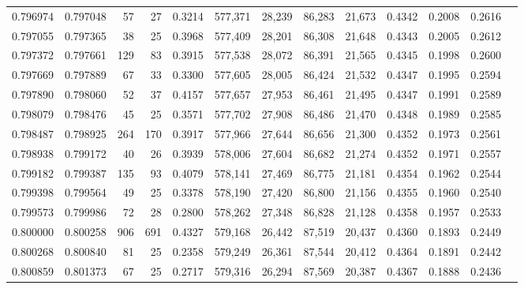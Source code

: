 \begin{tabular}{rrrrrrrrrrrrr}
0.796974 & 0.797048 &    57 &  27 &                                     0.3214 & 577,371 &  28,239 &  86,283 &  21,673 & 0.4342 & 0.2008 & 0.2616 \\
0.797055 & 0.797365 &    38 &  25 &                                     0.3968 & 577,409 &  28,201 &  86,308 &  21,648 & 0.4343 & 0.2005 & 0.2612 \\
0.797372 & 0.797661 &   129 &  83 &                                     0.3915 & 577,538 &  28,072 &  86,391 &  21,565 & 0.4345 & 0.1998 & 0.2600 \\
0.797669 & 0.797889 &    67 &  33 &                                     0.3300 & 577,605 &  28,005 &  86,424 &  21,532 & 0.4347 & 0.1995 & 0.2594 \\
0.797890 & 0.798060 &    52 &  37 &                                     0.4157 & 577,657 &  27,953 &  86,461 &  21,495 & 0.4347 & 0.1991 & 0.2589 \\
0.798079 & 0.798476 &    45 &  25 &                                     0.3571 & 577,702 &  27,908 &  86,486 &  21,470 & 0.4348 & 0.1989 & 0.2585 \\
0.798487 & 0.798925 &   264 & 170 &                                     0.3917 & 577,966 &  27,644 &  86,656 &  21,300 & 0.4352 & 0.1973 & 0.2561 \\
0.798938 & 0.799172 &    40 &  26 &                                     0.3939 & 578,006 &  27,604 &  86,682 &  21,274 & 0.4352 & 0.1971 & 0.2557 \\
0.799182 & 0.799387 &   135 &  93 &                                     0.4079 & 578,141 &  27,469 &  86,775 &  21,181 & 0.4354 & 0.1962 & 0.2544 \\
0.799398 & 0.799564 &    49 &  25 &                                     0.3378 & 578,190 &  27,420 &  86,800 &  21,156 & 0.4355 & 0.1960 & 0.2540 \\
0.799573 & 0.799986 &    72 &  28 &                                     0.2800 & 578,262 &  27,348 &  86,828 &  21,128 & 0.4358 & 0.1957 & 0.2533 \\
0.800000 & 0.800258 &   906 & 691 &                                     0.4327 & 579,168 &  26,442 &  87,519 &  20,437 & 0.4360 & 0.1893 & 0.2449 \\
0.800268 & 0.800840 &    81 &  25 &                                     0.2358 & 579,249 &  26,361 &  87,544 &  20,412 & 0.4364 & 0.1891 & 0.2442 \\
0.800859 & 0.801373 &    67 &  25 &                                     0.2717 & 579,316 &  26,294 &  87,569 &  20,387 & 0.4367 & 0.1888 & 0.2436 \\

\end{tabular}
